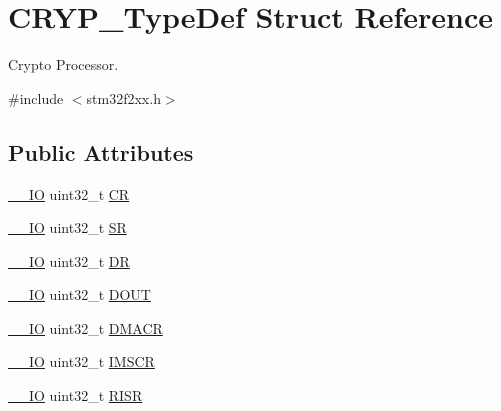 \hypertarget{struct_c_r_y_p___type_def}{\section{C\-R\-Y\-P\-\_\-\-Type\-Def Struct Reference}
\label{struct_c_r_y_p___type_def}
}


Crypto Processor.  




{\ttfamily \#include $<$stm32f2xx.\-h$>$}

\subsection*{Public Attributes}
\begin{DoxyCompactItemize}
\item 
\hyperlink{group___c_m_s_i_s__core__definitions_gaec43007d9998a0a0e01faede4133d6be}{\-\_\-\-\_\-\-I\-O} uint32\-\_\-t \hyperlink{struct_c_r_y_p___type_def_a65da2a40a06c5c391cbe346dbaa5380c}{C\-R}
\item 
\hyperlink{group___c_m_s_i_s__core__definitions_gaec43007d9998a0a0e01faede4133d6be}{\-\_\-\-\_\-\-I\-O} uint32\-\_\-t \hyperlink{struct_c_r_y_p___type_def_a1d5cabaf9aea97e1b6f08352bc249094}{S\-R}
\item 
\hyperlink{group___c_m_s_i_s__core__definitions_gaec43007d9998a0a0e01faede4133d6be}{\-\_\-\-\_\-\-I\-O} uint32\-\_\-t \hyperlink{struct_c_r_y_p___type_def_ab478a4717a3fa209b9c060ecaf70c9a1}{D\-R}
\item 
\hyperlink{group___c_m_s_i_s__core__definitions_gaec43007d9998a0a0e01faede4133d6be}{\-\_\-\-\_\-\-I\-O} uint32\-\_\-t \hyperlink{struct_c_r_y_p___type_def_a0b3e1f1551d11a01f7b2356e91281e7d}{D\-O\-U\-T}
\item 
\hyperlink{group___c_m_s_i_s__core__definitions_gaec43007d9998a0a0e01faede4133d6be}{\-\_\-\-\_\-\-I\-O} uint32\-\_\-t \hyperlink{struct_c_r_y_p___type_def_ad525241894427fc83a16e3370bb5b1d8}{D\-M\-A\-C\-R}
\item 
\hyperlink{group___c_m_s_i_s__core__definitions_gaec43007d9998a0a0e01faede4133d6be}{\-\_\-\-\_\-\-I\-O} uint32\-\_\-t \hyperlink{struct_c_r_y_p___type_def_a3ee13f960f6631c574b1018c97f95925}{I\-M\-S\-C\-R}
\item 
\hyperlink{group___c_m_s_i_s__core__definitions_gaec43007d9998a0a0e01faede4133d6be}{\-\_\-\-\_\-\-I\-O} uint32\-\_\-t \hyperlink{struct_c_r_y_p___type_def_a04be1b2f14a37aed1deff4d57e6261dd}{R\-I\-S\-R}
\item 

\end{DoxyCompactItemize}
